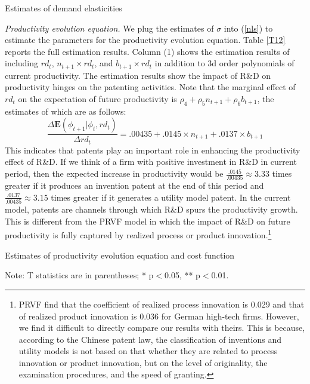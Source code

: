 \documentclass[11pt]{article}
\begin{document}
\begin{table}[h]
    \centering
    \caption{Estimates of demand elasticities}
    \label{T11}
    
    \end{table}

\textit{Productivity evolution equation.} We plug the estimates of $\sigma$ into (\ref{nls}) to estimate the
parameters for the productivity evolution equation.
Table \ref{T12} reports the full estimation results. Column (1) shows
the estimation results of including $rd_{t}$, $n_{t+1} \times rd_{t}$,
and $b_{t+1} \times rd_{t}$ in addition to 3d order polynomials of
current productivity. The estimation results show the impact of R\&D on productivity hinges
on the patenting activities. Note that the marginal effect of $rd_{t}$
on the expectation of future productivity is $\rho_{4}+\rho_{5}n_{t+1}+\rho_{6}b_{t+1}$, the estimates of which are as follows:
\[
\frac{\Delta\mathbf{E}\left(\phi_{t+1}|\phi_{t},rd_{t}\right)}{\Delta rd_{t}}=.00435+.0145\times n_{t+1}+.0137\times b_{t+1}
\]
This indicates that patents play an important role in enhancing the
productivity effect of R\&D. If we think of a firm with
positive investment in R\&D in current period, then the expected increase in productivity would be $\frac{.0145}{.00435}\approx 3.33$ times greater if it produces an invention patent at the end of this period and
$\frac{.0137}{.00435}\approx 3.15$ times greater if it generates a utility model patent. In the current model, patents are channels through which
R\&D spurs the productivity growth. This is different from the PRVF model in which the impact of R\&D on future productivity is fully captured by realized
process or product innovation.\footnote{PRVF find
that the coefficient of realized process innovation is 0.029 and that
of realized product innovation is 0.036 for German high-tech firms. However, we find it difficult to directly compare our results with theirs. This is because, according to the Chinese patent law, the classification of inventions and utility models is not based on that whether they are related to process innovation or product innovation, but on the level of originality, the examination procedures, and the speed of granting.} 

\begin{table}[h]
    \centering
    \caption{Estimates of productivity evolution equation and cost function}
    \label{T12}
    
    {\small{}Note: T statistics are in parentheses; {*} p$<$0.05, {*}{*}
    p$<$0.01. }{\small \par}
\end{table}
\end{document}
